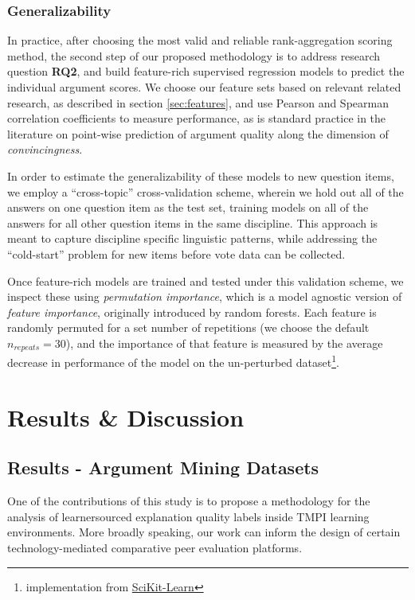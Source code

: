 \documentclass[notitlepage,12pt]{jedm}
\begin{document}
\subsubsection{Generalizability}
In practice, after choosing the most valid and reliable rank-aggregation 
scoring method, the second step of our proposed methodology is to address 
research question \textbf{RQ2}, and build feature-rich supervised regression 
models to predict the individual argument scores.
We choose our feature sets based on relevant related research, as described in 
section \ref{sec:features}, and use Pearson and Spearman correlation 
coefficients to measure performance, as is standard practice in the literature 
on point-wise prediction of argument quality along the dimension of 
\textit{convincingness}. 
 
In order to estimate the generalizability of these models to new question 
items, we employ a ``cross-topic'' cross-validation scheme, wherein we hold out 
all of the answers on one question item as the test set, training models on all 
of the answers for all other question items in the same discipline.
This approach is meant to capture discipline specific linguistic patterns, 
while addressing the ``cold-start'' problem for new items before vote data 
can be collected.

Once feature-rich models are trained and tested under this validation scheme, 
we inspect these using \textit{permutation importance}\cite{fisher_all_2019}, 
which is a model agnostic version of \textit{feature importance}, originally 
introduced by  random forests. 
Each feature is randomly permuted for a set number of repetitions (we choose 
the default $n_{repeats}=30$), and the importance of that feature is measured 
by the average decrease in performance of the model on the un-perturbed 
dataset\footnote{implementation from 
\href{https://scikit-learn.org/stable/modules/permutation_importance.html}{SciKit-Learn}}.



\section{Results \& Discussion}\label{sec:model_results}

\subsection{Results - Argument Mining Datasets}
One of the contributions of this study is to propose a methodology for the 
analysis of learnersourced explanation quality labels inside TMPI learning 
environments. 
More broadly speaking, our work can inform the design of certain 
technology-mediated comparative peer evaluation platforms.
\end{document}
